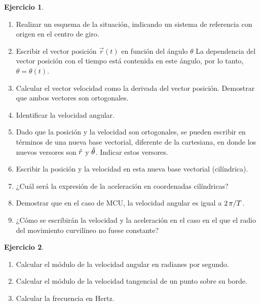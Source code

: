 \documentclass[a4paper,12pt,twoside]{book}
\newtheorem{ejercicio}{{Ejercicio}}[chapter]
\begin{document}
\begin{mdframed}[style=ejercicio-conceptual]
    \begin{ejercicio}
    \end{ejercicio}
    \begin{enumerate}
        \item Realizar un esquema de la situación, indicando un sistema de referencia con origen en el centro de giro. 
        \item Escribir el vector posición $\vec{r}(t)$ en función del ángulo $\theta$
        La dependencia del vector posición con el tiempo está contenida en este ángulo, por lo tanto, $\theta = \theta(t)$.
        \item Calcular el vector velocidad como la derivada del vector posición. Demostrar que ambos vectores son ortogonales. 
        \item Identificar la velocidad angular.
        \item Dado que la posición y la velocidad son ortogonales, se pueden escribir en términos de una nueva base vectorial, diferente de la cartesiana, en donde los nuevos versores son $\hat{r}$ y $\hat{\theta}$. Indicar estos versores. 
        \item Escribir la posición y la velocidad en esta nueva base vectorial (cilíndrica). 
        \item ¿Cuál será la expresión de la aceleración en coordenadas cilíndricas? 
        \item Demostrar que en el caso de MCU, la velocidad angular es igual a $2 \, \pi/T$.
        \item ¿Cómo se escribirán la velocidad y la aceleración en el caso en el que el radio del movimiento curvilíneo no fuese constante? 
    \end{enumerate}
\end{mdframed}

\begin{mdframed}[style=ejercicio-facil]
    \begin{ejercicio}
    \end{ejercicio}
    \begin{enumerate}
        \item Calcular el módulo de la velocidad angular en radianes por segundo.
        \item Calcular el módulo de la velocidad tangencial de un punto sobre su borde.
        \item Calcular la frecuencia en Hertz.
    \end{enumerate}
\end{mdframed}
\end{document}
